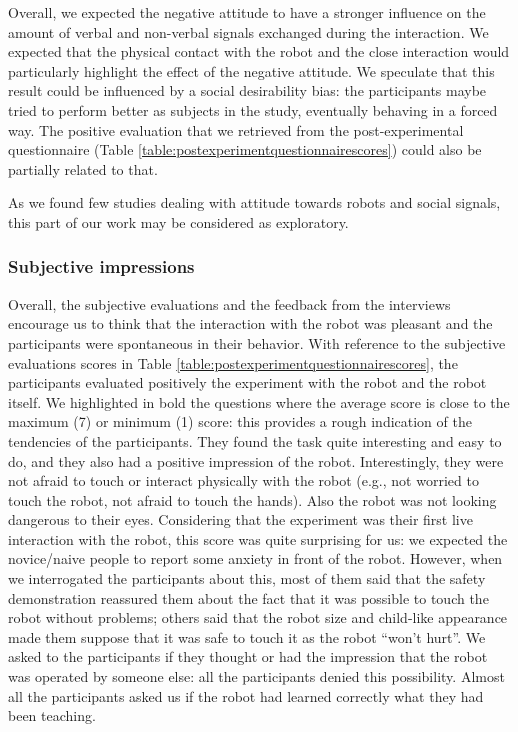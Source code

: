 Overall, we expected the negative attitude to have a stronger influence on the amount of verbal and non-verbal signals exchanged during the interaction. 
We expected that the physical contact with the robot and the close interaction would particularly highlight the effect of the negative attitude. 
We speculate that this result could be influenced by a social desirability bias: the participants maybe tried to perform better as subjects in the study, eventually behaving in a forced way. The positive evaluation that we retrieved from the post-experimental questionnaire (Table \ref{table:postexperimentquestionnairescores}) could also be partially related to that.

As we found few studies dealing with attitude towards robots and social signals, this part of our work may be considered as exploratory.


\subsubsection{Subjective impressions}

Overall, the subjective evaluations and the feedback from the interviews encourage us to think that the interaction with the robot was pleasant and the participants were spontaneous in their behavior.
With reference to the subjective evaluations scores in Table \ref{table:postexperimentquestionnairescores}, the participants evaluated positively the experiment with the robot and the robot itself. We highlighted in bold the questions where the average score is close to the maximum (7) or minimum (1) score: this provides a rough indication of the tendencies of the participants.
They found the task quite interesting and easy to do, and they also had a positive impression of the robot.  
Interestingly, they were not afraid to touch or interact physically with the robot (e.g., not worried to touch the robot, not afraid to touch the hands). Also the robot was not looking dangerous to their eyes.
Considering that the experiment was their first live interaction with the robot, this score was quite surprising for us: we expected the novice/naive people to report some anxiety in front of the robot. However, when we interrogated the participants about this, most of them said that the safety demonstration reassured them about the fact that it was possible to touch the robot without problems; others said that the robot size and child-like appearance made them suppose that it was safe to touch it as the robot ``won't hurt''.
We asked to the participants if they thought or had the impression that the robot was operated by someone else: all the participants denied this possibility. Almost all the participants asked us if the robot had learned correctly what they had been teaching.


